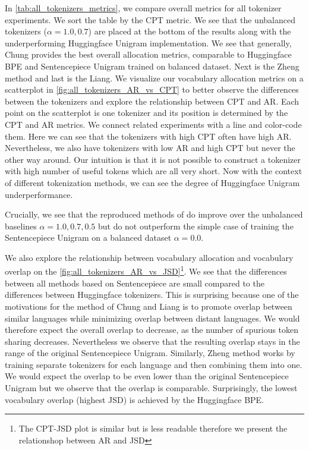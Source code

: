 In \autoref{tab:all_tokenizers_metrics}, we compare overall metrics for all tokenizer experiments. We sort the table by the CPT metric. We see that the unbalanced tokenizers ($\alpha=1.0, 0.7$) are placed at the bottom of the results along with the underperforming Huggingface Unigram implementation. We see that generally, Chung provides the best overall allocation metrics, comparable to Huggingface BPE and Sentencepiece Unigram trained on balanced dataset. Next is the Zheng method and last is the Liang. We visualize our vocabulary allocation metrics on a scatterplot in \autoref{fig:all_tokenizers_AR_vs_CPT} to better observe the differences between the tokenizers and explore the relationship between CPT and AR. Each point on the scatterplot is one tokenizer and its position is determined by the CPT and AR metrics. We connect related experiments with a line and color-code them. Here we can see that the tokenizers with high CPT often have high AR. Nevertheless, we also have tokenizers with low AR and high CPT but never the other way around. Our intuition is that it is not possible to construct a tokenizer with high number of useful tokens which are all very short. Now with the context of different tokenization methods, we can see the degree of Huggingface Unigram underperformance.

Crucially, we see that the reproduced methods of \citet{chung_improving_2020,zheng_allocating_2021,liang_xlm-v_2023} do improve over the unbalanced baselines $\alpha=1.0, 0.7, 0.5$ but do not outperform the simple case of training the Sentencepiece Unigram on a balanced dataset $\alpha=0.0$. 

We also explore the relationship between vocabulary allocation and vocabulary overlap on the \autoref{fig:all_tokenizers_AR_vs_JSD}\footnote{The CPT-JSD plot is similar but is less readable therefore we present the relationshop between AR and JSD}. We see that the differences between all methods based on Sentencepiece are small compared to the differences between Huggingface tokenizers. This is surprising because one of the motivations for the method of Chung and Liang is to promote overlap between similar languages while minimizing overlap between distant languages. We would therefore expect the overall overlap to decrease, as the number of spurious token sharing decreases. Nevertheless we observe that the resulting overlap stays in the range of the original Sentencepiece Unigram. Similarly, Zheng method works by training separate tokenizers for each language and then combining them into one. We would expect the overlap to be even lower than the original Sentencepiece Unigram but we observe that the overlap is comparable. 
Surprisingly, the lowest vocabulary overlap (highest JSD) is achieved by the Huggingface BPE. 

